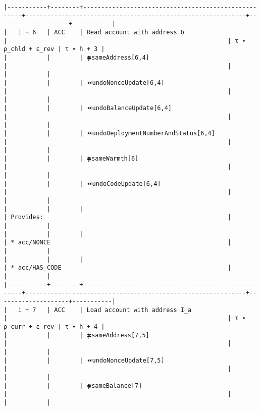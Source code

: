\documentclass[varwidth=\maxdimen,margin=0.5cm,multi={verbatim}]{standalone}
\begin{document}
\begin{verbatim}
|-----------+--------+-----------------------------------------------------+-------------------------------------------------------------+--------------------+-----------|
|   i + 6   | ACC    | Read account with address δ                         |                                                             | τ ∙ ρ_chld + ε_rev | τ ∙ h + 3 |
|           |        | 🍀sameAddress[6,4]                                  |                                                             |                    |           |
|           |        | ⏪undoNonceUpdate[6,4]                              |                                                             |                    |           |
|           |        | ⏪undoBalanceUpdate[6,4]                            |                                                             |                    |           |
|           |        | ⏪undoDeploymentNumberAndStatus[6,4]                |                                                             |                    |           |
|           |        | 🍀sameWarmth[6]                                     |                                                             |                    |           |
|           |        | ⏪undoCodeUpdate[6,4]                               |                                                             |                    |           |
|           |        |                                                     | Provides:                                                   |                    |           |
|           |        |                                                     | * acc/NONCE                                                 |                    |           |
|           |        |                                                     | * acc/HAS_CODE                                              |                    |           |
|-----------+--------+-----------------------------------------------------+-------------------------------------------------------------+--------------------+-----------|
|   i + 7   | ACC    | Load account with address I_a                       |                                                             | τ ∙ ρ_curr + ε_rev | τ ∙ h + 4 |
|           |        | 🍀sameAddress[7,5]                                  |                                                             |                    |           |
|           |        | ⏪undoNonceUpdate[7,5]                              |                                                             |                    |           |
|           |        | 🍀sameBalance[7]                                    |                                                             |                    |           |

\end{verbatim}
\end{document}
